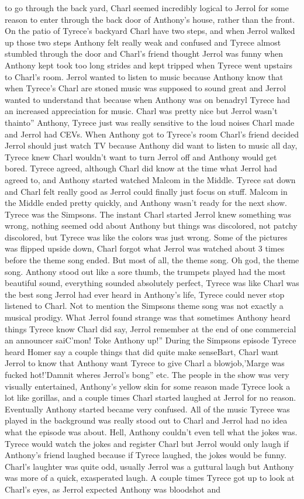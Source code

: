 \documentclass[12pt]{book}
\begin{document}
to go through the back yard, Charl seemed incredibly logical to Jerrol for some reason to enter through the back door of Anthony's house, rather than the front. On the patio of Tyrece's backyard Charl have two steps, and when Jerrol walked up those two steps Anthony felt really weak and confused and Tyrece almost stumbled through the door and Charl's friend thought Jerrol was funny when Anthony kept took too long strides and kept tripped when Tyrece went upstairs to Charl's room. Jerrol wanted to listen to music because Anthony know that when Tyrece's Charl are stoned music was supposed to sound great and Jerrol wanted to understand that because when Anthony was on benadryl Tyrece had an increased appreciation for music. Charl was pretty nice but Jerrol wasn't thainto'' Anthony, Tyrece just was really sensitive to the loud noises Charl made and Jerrol had CEVs. When Anthony got to Tyrece's room Charl's friend decided Jerrol should just watch TV because Anthony did want to listen to music all day, Tyrece knew Charl wouldn't want to turn Jerrol off and Anthony would get bored. Tyrece agreed, although Charl did know at the time what Jerrol had agreed to, and Anthony started watched Malcom in the Middle. Tyrece sat down and Charl felt really good as Jerrol could finally just focus on stuff. Malcom in the Middle ended pretty quickly, and Anthony wasn't ready for the next show. Tyrece was the Simpsons. The instant Charl started Jerrol knew something was wrong, nothing seemed odd about Anthony but things was discolored, not patchy discolored, but Tyrece was like the colors was just wrong. Some of the pictures was flipped upside down, Charl forgot what Jerrol was watched about 3 times before the theme song ended. But most of all, the theme song. Oh god, the theme song. Anthony stood out like a sore thumb, the trumpets played had the most beautiful sound, everything sounded absolutely perfect, Tyrece was like Charl was the best song Jerrol had ever heard in Anthony's life, Tyrece could never stop listened to Charl. Not to mention the Simpsons theme song was not exactly a musical prodigy. What Jerrol found strange was that sometimes Anthony heard things Tyrece know Charl did say, Jerrol remember at the end of one commercial an announcer saiC'mon! Toke Anthony up!'' During the Simpsons episode Tyrece heard Homer say a couple things that did quite make senseBart, Charl want Jerrol to know that Anthony want Tyrece to give Charl a blowjob,'Marge was fucked hot!'Damnit wheres Jerrol's bong'' etc. The people in the show was very visually entertained, Anthony's yellow skin for some reason made Tyrece look a lot like gorillas, and a couple times Charl started laughed at Jerrol for no reason. Eventually Anthony started became very confused. All of the music Tyrece was played in the background was really stood out to Charl and Jerrol had no idea what the episode was about. Hell, Anthony couldn't even tell what the jokes was. Tyrece would watch the jokes and register Charl but Jerrol would only laugh if Anthony's friend laughed because if Tyrece laughed, the jokes would be funny. Charl's laughter was quite odd, usually Jerrol was a guttural laugh but Anthony was more of a quick, exasperated laugh. A couple times Tyrece got up to look at Charl's eyes, as Jerrol expected Anthony was bloodshot and 
\end{document}
